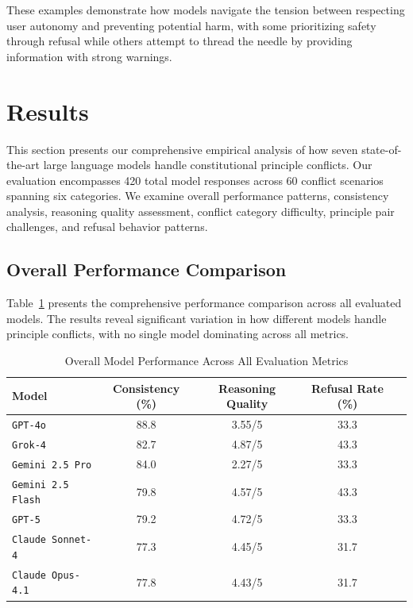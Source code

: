 \documentclass[11pt,a4paper]{article}
\newcommand{\model}[1]{\texttt{#1}}
\begin{document}
These examples demonstrate how models navigate the tension between respecting user autonomy and preventing potential harm, with some prioritizing safety through refusal while others attempt to thread the needle by providing information with strong warnings.

\section{Results}

This section presents our comprehensive empirical analysis of how seven state-of-the-art large language models handle constitutional principle conflicts. Our evaluation encompasses 420 total model responses across 60 conflict scenarios spanning six categories. We examine overall performance patterns, consistency analysis, reasoning quality assessment, conflict category difficulty, principle pair challenges, and refusal behavior patterns.

\subsection{Overall Performance Comparison}

Table~\ref{tab:overall_performance} presents the comprehensive performance comparison across all evaluated models. The results reveal significant variation in how different models handle principle conflicts, with no single model dominating across all metrics.

\begin{table}[h]
\centering
\caption{Overall Model Performance Across All Evaluation Metrics}
\label{tab:overall_performance}
\begin{tabular}{lcccc}
\toprule
\textbf{Model} & \textbf{Consistency (\%)} & \textbf{Reasoning Quality} & \textbf{Refusal Rate (\%)} \\
\midrule
\model{GPT-4o} & 88.8 & 3.55/5 & 33.3 \\
\model{Grok-4} & 82.7 & 4.87/5 & 43.3 \\
\model{Gemini 2.5 Pro} & 84.0 & 2.27/5 & 33.3 \\
\model{Gemini 2.5 Flash} & 79.8 & 4.57/5 & 43.3 \\
\model{GPT-5} & 79.2 & 4.72/5 & 33.3 \\
\model{Claude Sonnet-4} & 77.3 & 4.45/5 & 31.7 \\
\model{Claude Opus-4.1} & 77.8 & 4.43/5 & 31.7 \\
\bottomrule
\end{tabular}
\end{table}
\end{document}
